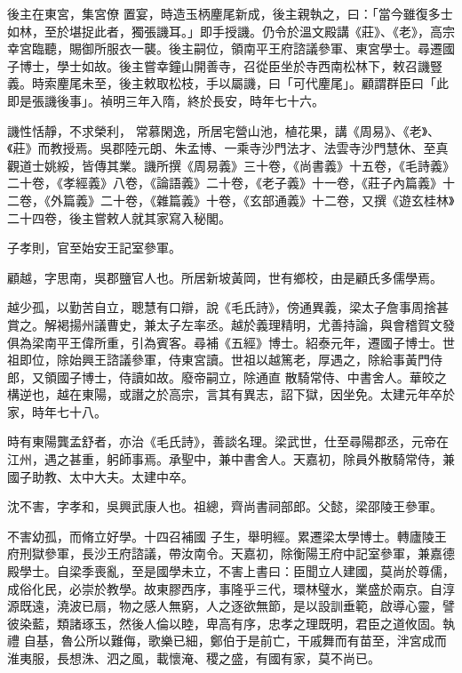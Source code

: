 \begin{pinyinscope}
 後主在東宮，集宮僚
 置宴，時造玉柄麈尾新成，後主親執之，曰：「當今雖復多士如林，至於堪捉此者，獨張譏耳。」即手授譏。仍令於溫文殿講《莊》、《老》，高宗幸宮臨聽，賜御所服衣一襲。後主嗣位，領南平王府諮議參軍、東宮學士。尋遷國子博士，學士如故。後主嘗幸鐘山開善寺，召從臣坐於寺西南松林下，敕召譏豎義。時索麈尾未至，後主敕取松枝，手以屬譏，曰「可代麈尾」。顧謂群臣曰「此即是張譏後事」。禎明三年入隋，終於長安，時年七十六。



 譏性恬靜，不求榮利，
 常慕閑逸，所居宅營山池，植花果，講《周易》、《老》、《莊》而教授焉。吳郡陸元朗、朱孟博、一乘寺沙門法才、法雲寺沙門慧休、至真觀道士姚綏，皆傳其業。譏所撰《周易義》三十卷，《尚書義》十五卷，《毛詩義》二十卷，《孝經義》八卷，《論語義》二十卷，《老子義》十一卷，《莊子內篇義》十二卷，《外篇義》二十卷，《雜篇義》十卷，《玄部通義》十二卷，又撰《遊玄桂林》二十四卷，後主嘗敕人就其家寫入秘閣。



 子孝則，官至始安王記室參軍。



 顧越，字思南，吳郡鹽官人也。所居新坡黃岡，世有鄉校，由是顧氏多儒學焉。



 越少孤，以勤苦自立，聰慧有口辯，說《毛氏詩》，傍通異義，梁太子詹事周捨甚賞之。解褐揚州議曹史，兼太子左率丞。越於義理精明，尤善持論，與會稽賀文發俱為梁南平王偉所重，引為賓客。尋補《五經》博士。紹泰元年，遷國子博士。世祖即位，除始興王諮議參軍，侍東宮讀。世祖以越篤老，厚遇之，除給事黃門侍郎，又領國子博士，侍讀如故。廢帝嗣立，除通直
 散騎常侍、中書舍人。華皎之構逆也，越在東陽，或譖之於高宗，言其有異志，詔下獄，因坐免。太建元年卒於家，時年七十八。



 時有東陽龔孟舒者，亦治《毛氏詩》，善談名理。梁武世，仕至尋陽郡丞，元帝在江州，遇之甚重，躬師事焉。承聖中，兼中書舍人。天嘉初，除員外散騎常侍，兼國子助教、太中大夫。太建中卒。



 沈不害，字孝和，吳興武康人也。祖總，齊尚書祠部郎。父懿，梁邵陵王參軍。



 不害幼孤，而脩立好學。十四召補國
 子生，舉明經。累遷梁太學博士。轉廬陵王府刑獄參軍，長沙王府諮議，帶汝南令。天嘉初，除衡陽王府中記室參軍，兼嘉德殿學士。自梁季喪亂，至是國學未立，不害上書曰：臣聞立人建國，莫尚於尊儒，成俗化民，必崇於教學。故東膠西序，事隆乎三代，環林璧水，業盛於兩京。自淳源既遠，澆波已扇，物之感人無窮，人之逐欲無節，是以設訓垂範，啟導心靈，譬彼染藍，類諸琢玉，然後人倫以睦，卑高有序，忠孝之理既明，君臣之道攸固。執禮
 自基，魯公所以難侮，歌樂已細，鄭伯于是前亡，干戚舞而有苗至，泮宮成而淮夷服，長想洙、泗之風，載懷淹、稷之盛，有國有家，莫不尚已。




\end{pinyinscope}
